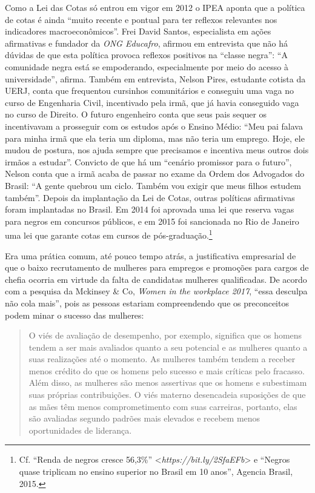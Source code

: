 Como a Lei das Cotas só entrou em vigor em 2012 o IPEA aponta que a
política de cotas é ainda ``muito recente e pontual para ter reflexos
relevantes nos indicadores macroeconômicos''. Frei David Santos,
especialista em ações afirmativas e fundador da \emph{ONG Educafro},
afirmou em entrevista que não há dúvidas de que esta política provoca
reflexos positivos na ``classe negra'': ``A comunidade negra está se
empoderando, especialmente por meio do acesso à universidade'', afirma.
Também em entrevista, Nelson Pires, estudante cotista da UERJ, conta que
frequentou cursinhos comunitários e conseguiu uma vaga no curso de
Engenharia Civil, incentivado pela irmã, que já havia conseguido vaga no
curso de Direito. O futuro engenheiro conta que seus pais sequer os
incentivavam a prosseguir com os estudos após o Ensino Médio: ``Meu pai
falava para minha irmã que ela teria um diploma, mas não teria um
emprego. Hoje, ele mudou de postura, nos ajuda sempre que precisamos e
incentiva meus outros dois irmãos a estudar''. Convicto de que há um
``cenário promissor para o futuro'', Nelson conta que a irmã acaba de
passar no exame da Ordem dos Advogados do Brasil: ``A gente quebrou um
ciclo. Também vou exigir que meus filhos estudem também''. Depois da
implantação da Lei de Cotas, outras políticas afirmativas foram
implantadas no Brasil. Em 2014 foi aprovada uma lei que reserva vagas
para negros em concursos públicos, e em 2015 foi sancionada no Rio de
Janeiro uma lei que garante cotas em cursos de pós-graduação.\footnote{Cf.
  ``Renda de negros cresce 56,3\%''
  \textless{}\emph{https://bit.ly/2SfaEFb}\textgreater{}
  e ``Negros quase triplicam no ensino superior no Brasil em 10 anos'',
  Agencia Brasil, 2015.}

Era uma prática comum, até pouco tempo atrás, a justificativa
empresarial de que o baixo recrutamento de mulheres para empregos e
promoções para cargos de chefia ocorria em virtude da falta de
candidatas mulheres qualificadas. De acordo com a pesquisa da Mckinsey
\& Co, \emph{Women in the workplace 2017}, ``essa desculpa não cola
mais'', pois as pessoas estariam compreendendo que os preconceitos podem
minar o sucesso das mulheres:

\begin{quote}
O viés de avaliação de desempenho, por exemplo, significa que os homens
tendem a ser mais avaliados quanto a seu potencial e as mulheres quanto
a suas realizações até o momento. As mulheres também tendem a receber
menos crédito do que os homens pelo sucesso e mais críticas pelo
fracasso. Além disso, as mulheres são menos assertivas que os homens e
subestimam suas próprias contribuições. O viés materno desencadeia
suposições de que as mães têm menos comprometimento com suas carreiras,
portanto, elas são avaliadas segundo padrões mais elevados e recebem
menos oportunidades de liderança.
\end{quote}

